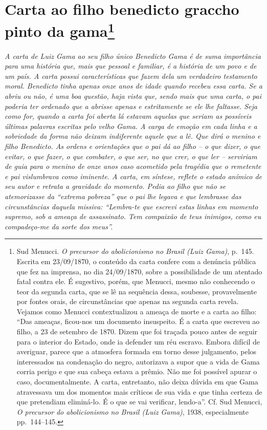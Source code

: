 \chapter{Carta ao filho benedicto graccho pinto da gama\footnote{Sud Menucci. \emph{O precursor do abolicionismo no
  Brasil (Luiz Gama)}, p.~145. Escrita em 23/09/1870, o conteúdo da
  carta confere com a denúncia pública que fez na imprensa, no dia
  24/09/1870, sobre a possibilidade de um atentado fatal contra ele. É
  sugestivo, porém, que Menucci, mesmo não conhecendo o teor da segunda
  carta, que se lê na sequência dessa, soubesse, provavelmente por
  fontes orais, de circunstâncias que apenas na segunda carta revela.
  Vejamos como Menucci contextualizou a ameaça de morte e a carta ao
  filho: ``Das ameaças, ficou-nos um documento insuspeito. É a carta que
  escreveu ao filho, a 23 de setembro de 1870. Dizem que foi traçada
  pouco antes de seguir para o interior do Estado, onde ia defender um
  réu escravo. Embora difícil de averiguar, parece que a atmosfera
  formada em torno desse julgamento, pelos interessados na condenação do
  negro, autorizava a supor que a vida de Gama corria perigo e que sua
  cabeça estava a prêmio. Não me foi possível apurar o caso,
  documentalmente. A carta, entretanto, não deixa dúvida em que Gama
  atravessava um dos momentos mais críticos de sua vida e que tinha
  certeza de que pretendiam eliminá-lo. É o que se vai verificar,
  lendo-a''. Cf. Sud Menucci, \emph{O precursor} \emph{do abolicionismo
  no Brasil (Luiz Gama)}, 1938, especialmente pp.~144--145.}} %

\begin{didascalia}
\emph{A carta de Luiz Gama ao seu filho único Benedicto Gama é de suma
importância para uma história que, mais que pessoal e familiar, é a
história de um povo e de um país. A carta possui características que
fazem dela um verdadeiro testamento moral. Benedicto tinha apenas onze
anos de idade quando recebeu essa carta. Se a abriu ou não, é uma boa
questão, haja vista que, sendo mais que uma carta, o pai poderia ter
ordenado que a abrisse apenas e estritamente se ele lhe faltasse. Seja
como for, quando a carta foi aberta lá estavam aquelas que seriam as
possíveis últimas palavras escritas pelo velho Gama. A carga de emoção
em cada linha e a sobriedade da forma não deixam indiferente aquele que
a lê. Que dirá o menino e filho Benedicto. As ordens e orientações que o
pai dá ao filho -- o que dizer, o que evitar, o que fazer, o que
combater, o que ser, no que crer, o que ler -- serviriam de guia para o
menino de onze anos caso acometido pela tragédia que o remetente e pai
vislumbrava como iminente. A carta, em síntese, reflete o estado anímico
de seu autor e retrata a gravidade do momento. Pedia ao filho que não se
atemorizasse da ``extrema pobreza'' que o pai lhe legava e que lembrasse
das circunstâncias daquela missiva: ``Lembra-te que escrevi estas linhas
em momento supremo, sob a ameaça de assassinato. Tem compaixão de teus
inimigos, como eu compadeço-me da sorte dos meus''.}
\end{didascalia}


